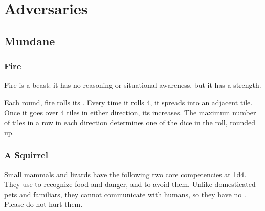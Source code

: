 \documentclass{LegrandOrangeTufteBook}
\begin{document}
\chapterspaceabove{6.75cm}
\chapterspacebelow{11.25cm}


\chapter*{Adversaries}

\section*{Mundane}

\subsection*{Fire}

Fire is a beast: it has no reasoning or situational awareness, but it has a strength.
\begin{center}
\end{center}

Each round, fire rolls its . Every time it rolls 4, it spreads into an adjacent tile.
Once it goes over 4 tiles in either direction, its  increases.
The maximum number of tiles in a row in each direction determines one of the dice in the  roll, rounded up.
\\



\subsection*{A Squirrel}
Small mammals and lizards have the following two core competencies at 1d4.
They use  to recognize food and danger,
and  to avoid them.
Unlike domesticated pets and familiars, they cannot communicate with
humans, so they have no .
Please do not hurt them.\\
\begin{center}
\end{center}
\end{document}
